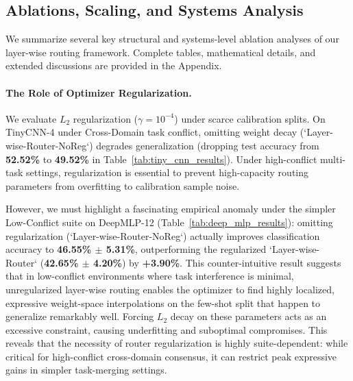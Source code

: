 \subsection{Ablations, Scaling, and Systems Analysis}

We summarize several key structural and systems-level ablation analyses of our layer-wise routing framework. Complete tables, mathematical details, and extended discussions are provided in the Appendix.

\paragraph{The Role of Optimizer Regularization.} We evaluate $L_2$ regularization ($\gamma=10^{-4}$) under scarce calibration splits. On TinyCNN-4 under Cross-Domain task conflict, omitting weight decay (`Layer-wise-Router-NoReg`) degrades generalization (dropping test accuracy from \textbf{52.52\%} to \textbf{49.52\%} in Table~\ref{tab:tiny_cnn_results}). Under high-conflict multi-task settings, regularization is essential to prevent high-capacity routing parameters from overfitting to calibration sample noise. 

However, we must highlight a fascinating empirical anomaly under the simpler Low-Conflict suite on DeepMLP-12 (Table~\ref{tab:deep_mlp_results}): omitting regularization (`Layer-wise-Router-NoReg`) actually improves classification accuracy to \textbf{46.55\% $\pm$ 5.31\%}, outperforming the regularized `Layer-wise-Router` (\textbf{42.65\% $\pm$ 4.20\%}) by \textbf{+3.90\%}. This counter-intuitive result suggests that in low-conflict environments where task interference is minimal, unregularized layer-wise routing enables the optimizer to find highly localized, expressive weight-space interpolations on the few-shot split that happen to generalize remarkably well. Forcing $L_2$ decay on these parameters acts as an excessive constraint, causing underfitting and suboptimal compromises. This reveals that the necessity of router regularization is highly suite-dependent: while critical for high-conflict cross-domain consensus, it can restrict peak expressive gains in simpler task-merging settings.

